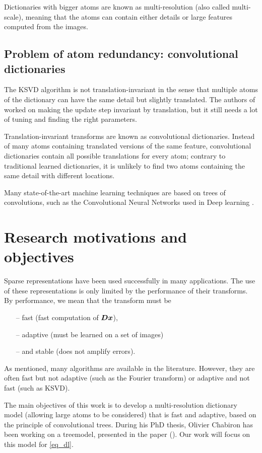 \noindent
Dictionaries with bigger atoms are known as multi-resolution (also called multi-scale), meaning that the atoms can contain either details or large features computed from the images.


\subsection{Problem of atom redundancy: convolutional dictionaries}\label{sec_atoms_redund}
The \ac{KSVD} algorithm is not translation-invariant in the sense that multiple atoms of the dictionary can have the same detail but slightly translated. The authors of \cite{mailhe_shift-invariant_2008} worked on making the update step invariant by translation, but it still needs a lot of tuning and finding the right parameters.

\noindent
Translation-invariant transforms are known as convolutional dictionaries. Instead of many atoms containing translated versions of the same feature, convolutional dictionaries contain all possible translations for every atom; contrary to traditional learned dictionaries, it is unlikely to find two atoms containing the same detail with different locations.

\noindent
Many state-of-the-art machine learning techniques are based on trees of convolutions, such as the Convolutional Neural Networks used in Deep learning \cite{lecun_deep_2015}.

\section{Research motivations and objectives}
Sparse representations have been used successfully in many applications. The use of these representations is only limited by the performance of their transforms. By performance, we mean that the transform must be
\begin{itemize}
\item[--] fast (fast computation of $\bm{D}\bm{x}$),
\item[--] adaptive (must be learned on a set of images)
\item[--] and stable (does not amplify errors).
\end{itemize}

\noindent
As mentioned, many algorithms are available in the literature. However, they are often fast but not adaptive (such as the Fourier transform) or adaptive and not fast (such as \ac{KSVD}).

\noindent
The main objectives of this work is to develop a multi-resolution dictionary model (allowing large atoms to be considered) that is fast and adaptive, based on the principle of convolutional trees. During his PhD thesis, Olivier Chabiron has been working on a \Gls{treemodel}, presented in the paper  (\cite{chabiron_optimization_2016}). Our work will focus on this model for \eqref{eq_dl}.


